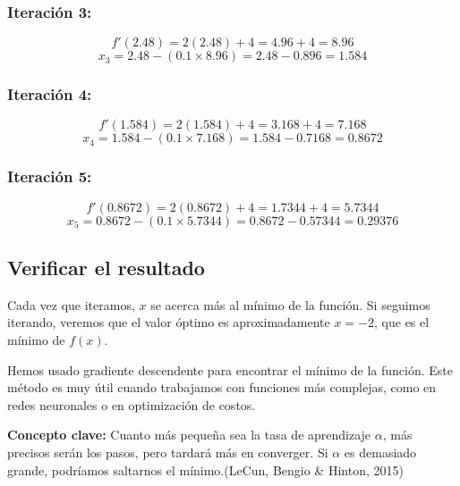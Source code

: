	\subsubsection{Iteración 3:}
	\[
	f'(2.48) = 2(2.48) + 4 = 4.96 + 4 = 8.96
	\]
	\[
	x_3 = 2.48 - (0.1 \times 8.96) = 2.48 - 0.896 = 1.584
	\]
	
	\subsubsection{Iteración 4:}
	\[
	f'(1.584) = 2(1.584) + 4 = 3.168 + 4 = 7.168
	\]
	\[
	x_4 = 1.584 - (0.1 \times 7.168) = 1.584 - 0.7168 = 0.8672
	\]
	
	\subsubsection{Iteración 5:}
	\[
	f'(0.8672) = 2(0.8672) + 4 = 1.7344 + 4 = 5.7344
	\]
	\[
	x_5 = 0.8672 - (0.1 \times 5.7344) = 0.8672 - 0.57344 = 0.29376
	\]
	
	\subsection{Verificar el resultado}
	
	Cada vez que iteramos, \(x\) se acerca más al mínimo de la función. Si seguimos iterando, veremos que el valor óptimo es aproximadamente \(x = -2\), que es el mínimo de \(f(x)\).
	
	Hemos usado gradiente descendente para encontrar el mínimo de la función. Este método es muy útil cuando trabajamos con funciones más complejas, como en redes neuronales o en optimización de costos.
	
	\vspace{0.5cm}
	
	\textbf{Concepto clave:}  
	Cuanto más pequeña sea la tasa de aprendizaje \(\alpha\), más precisos serán los pasos, pero tardará más en converger. Si \(\alpha\) es demasiado grande, podríamos saltarnos el mínimo.(LeCun, Bengio \& Hinton, 2015) 
	

